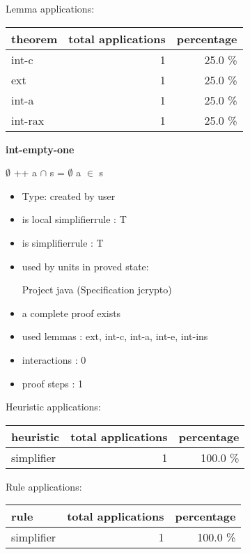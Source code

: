 \documentclass[a4paper]{article}
\begin{document}
Lemma applications:

\begin{supertabular}{l|r|r}
theorem	        & total applications & percentage \\ \hline
int-c & 1 & 25.0 \% \\
ext & 1 & 25.0 \% \\
int-a & 1 & 25.0 \% \\
int-rax & 1 & 25.0 \% \\

\end{supertabular}
\pagebreak

{\LARGE\bf int-empty-one}\label{lemma-int-empty-one}

\medskip

 \Fol $\emptyset$ ++ a $\cap$ s = $\emptyset$ \Equiv \Not a $\in$ s

\begin{itemize}

\item Type: created by user

\item is local simplifierrule : T
\item is simplifierrule : T
\item used by units in proved state:

Project java (Specification jcrypto)
\item       a complete proof exists
\item       used lemmas  : ext, int-c, int-a, int-e, int-ins
\item       interactions : 0
\item       proof steps  : 1
\end{itemize}

\medskip


Heuristic applications:

\begin{supertabular}{l|r|r}
heuristic	& total applications & percentage \\ \hline
simplifier & 1 & 100.0 \% \\

\end{supertabular}

Rule applications:

\begin{supertabular}{l|r|r}
rule	        & total applications & percentage \\ \hline
simplifier & 1 & 100.0 \% \\

\end{supertabular}
\end{document}
